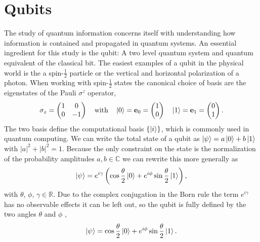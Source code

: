 \section{Qubits}\label{sec:qubits}

The study of quantum information concerns itself with understanding how information is contained and propagated in quantum systems. An essential ingredient for this study is the qubit: A two level quantum system and quantum equivalent of the classical bit. The easiest examples of a qubit in the physical world is the a spin-$\frac{1}{2}$ particle or the vertical and horizontal polarization of a photon.  When working with spin-$\frac{1}{2}$ states the canonical choice of basis are the eigenstates of the Pauli $\sigma^z$ operator,
\begin{equation*}
    \sigma_z = \begin{pmatrix}
                    1 & 0\\
                    0 & -1  
            \end{pmatrix} \quad \text{with} \quad
            \ket{0} = \mathbf{e}_0 = \begin{pmatrix}
                    1 \\
                    0  
            \end{pmatrix}
            \quad 
            \ket{1} = \mathbf{e}_1 =
            \begin{pmatrix}
                    0 \\
                    1  
            \end{pmatrix}.
\end{equation*}
The two basis define the computational basis $\{\ket{i}\}$, which is commonly used in quantum computing. 
We can write the total state of a qubit as $\ket{\psi} = a \ket{0} + b \ket{1}$ with $|a|^2 + |b|^2 = 1$. Because the only constraint on the state is the normalization of the probability amplitudes $a,b \in \mathbb{C}$ we can rewrite this more generally as
\begin{equation*}
    \ket{\psi} = e^{i\gamma}\left(\cos \frac{\theta}{2}\ket{0} +  e^{i\phi}\sin\frac{\theta}{2}\ket{1} \right),
\end{equation*}
with $\theta$, $\phi$, $\gamma \in \mathbb{R}$. Due to the complex conjugation in the Born rule the term $e^{i\gamma}$ has no observable effects it can be left out, so the qubit is fully defined by the two angles $\theta$ and $\phi$ \cite{Nielsen2011},
\begin{equation}
    \ket{\psi} = \cos \frac{\theta}{2}\ket{0} +  e^{i\phi}\sin\frac{\theta}{2}\ket{1}
    \label{eq:bloch}.
\end{equation}
